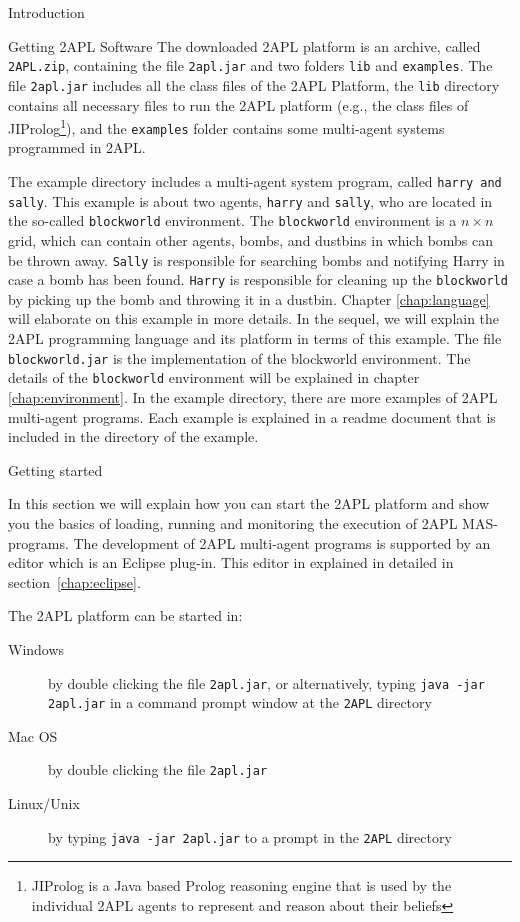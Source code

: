 \begin{chapter}{Introduction}
\begin{section}{Getting 2APL Software}
The downloaded 2APL platform is an archive, called {\tt 2APL.zip},
containing the file {\tt 2apl.jar} and two folders {\tt lib} and
{\tt examples}. The file {\tt 2apl.jar} includes all the class files
of the 2APL Platform, the {\tt lib} directory contains all necessary
files to run the 2APL platform (e.g., the class files of
JIProlog\footnote{JIProlog is a Java based Prolog reasoning engine
that is used by the individual 2APL agents to represent and reason
about their beliefs}), and the {\tt examples} folder contains some
multi-agent systems programmed in 2APL.

The example directory includes a multi-agent system program, called
{\tt harry and sally}. This example is about two agents, {\tt harry}
and {\tt sally}, who are located in the so-called {\tt blockworld}
environment. The {\tt blockworld} environment is a $n \times n$
grid, which can contain other agents, bombs, and dustbins in which
bombs can be thrown away. {\tt Sally} is responsible for searching
bombs and notifying Harry in case a bomb has been found. {\tt Harry}
is responsible for cleaning up the {\tt blockworld} by picking up
the bomb and throwing it in a dustbin. Chapter \ref{chap:language}
will elaborate on this example in more details. In the sequel, we
will explain the 2APL programming language and its platform in terms
of this example. The file {\tt blockworld.jar} is the implementation
of the blockworld environment. The details of the {\tt blockworld}
environment will be explained in chapter \ref{chap:environment}. In
the example directory, there are more examples of 2APL multi-agent
programs. Each example is explained in a readme document that is
included in the directory of the example.
\end{section}

\begin{section}{Getting started}

In this section we will explain how you can start
the 2APL platform and show you the
basics of loading, running and monitoring the execution of 2APL
MAS-programs. The development of 2APL multi-agent
programs is supported by an editor which is an Eclipse plug-in. This
editor in explained in detailed in section~\ref{chap:eclipse}.

The 2APL platform can be started in:
    \begin{description}
        \item[Windows] by double clicking the file {\tt 2apl.jar}, or
            alternatively, typing {\tt java -jar 2apl.jar} in a command prompt window at
            the {\tt 2APL} directory
        \item[Mac OS] by double clicking the file {\tt 2apl.jar}
        \item[Linux/Unix] by typing {\tt java -jar 2apl.jar} to a
            prompt in the {\tt 2APL} directory
    \end{description}


\end{section}
\end{chapter}
